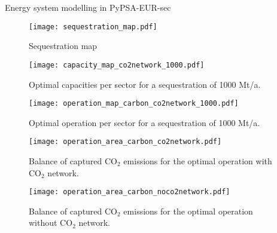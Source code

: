Energy system modelling in PyPSA-EUR-sec~\cite{brownSynergiesSectorCoupling2018}


\begin{figure}
    \centering
    \texttt{[image: sequestration\_map.pdf]}
    \caption{Sequestration map}
    \label{fig:sequestration_map}
\end{figure}


\begin{figure*}[h]
    \centering
    \texttt{[image: capacity\_map\_co2network\_1000.pdf]}
    \caption{Optimal capacities per sector for a sequestration of 1000 Mt/a.}
    \label{fig:capacity_map_noco2network_1000}
\end{figure*}

\begin{figure*}
    \centering
    \texttt{[image: operation\_map\_carbon\_co2network\_1000.pdf]}
    \caption{Optimal operation per sector for a sequestration of 1000 Mt/a.}
    \label{fig:operation_map_noco2network_1000}
\end{figure*}


\begin{figure}
    \centering
    \texttt{[image: operation\_area\_carbon\_co2network.pdf]}
    \caption{Balance of captured CO$_2$ emissions for the optimal operation with CO$_2$ network.}
    \label{fig:operation_area_carbon_co2network}
\end{figure}

\begin{figure}
    \centering
    \texttt{[image: operation\_area\_carbon\_noco2network.pdf]}
    \caption{Balance of captured CO$_2$ emissions for the optimal operation without CO$_2$ network.}
    \label{fig:operation_area_carbon_noco2network}
\end{figure}
